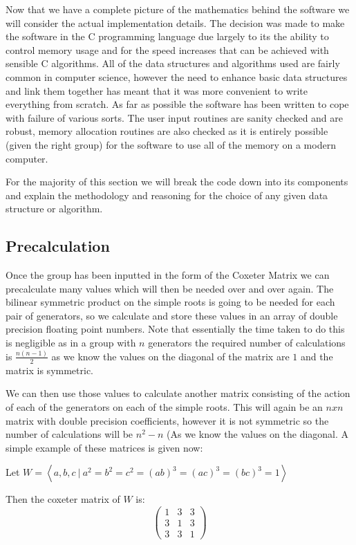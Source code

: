 \documentclass[a4paper,12pt]{article}
\begin{document}
Now that we have a complete picture of the mathematics behind the software we will consider the actual implementation details. The decision was made to make the software in the C programming language due largely to its the ability to control memory usage and for the speed increases that can be achieved with sensible C algorithms. All of the data structures and algorithms used are fairly common in computer science, however the need to enhance basic data structures and link them together has meant that it was more convenient to write everything from scratch. As far as possible the software has been written to cope with failure of various sorts. The user input routines are sanity checked and are robust, memory allocation routines are also checked as it is entirely possible (given the right group) for the software to use all of the memory on a modern computer.

For the majority of this section we will break the code down into its components and explain the methodology and reasoning for the choice of any given data structure or algorithm.

\subsection{Precalculation}

Once the group has been inputted in the form of the Coxeter Matrix we can precalculate many values which will then be needed over and over again. The bilinear symmetric product on the simple roots is going to be needed for each pair of generators, so we calculate and store these values in an array of double precision floating point numbers. Note that essentially the time taken to do this is negligible as in a group with $n$ generators the required number of calculations is $\frac{n(n-1)}{2}$ as we know the values on the diagonal of the matrix are $1$ and the matrix is symmetric. 

We can then use those values to calculate another matrix consisting of the action of each of the generators on each of the simple roots. This will again be an $n x n$ matrix with double precision coefficients, however it is not symmetric so the number of calculations will be $n^2-n$ (As we know the values on the diagonal. A simple example of these matrices is given now:

Let $W = \left\langle a,b,c \: | \: a^2=b^2=c^2=(ab)^3=(ac)^3=(bc)^3=1\right\rangle$

Then the coxeter matrix of $W$ is:
\[ \left(\begin{array}{ccc}
	1 & 3 & 3 \\
	3 & 1 & 3 \\
	3 & 3 & 1
\end{array}\right) \]
\end{document}

